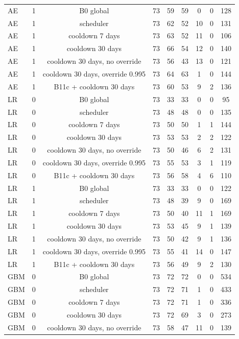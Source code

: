 \documentclass[10pt,onecolumn,letterpaper]{article}
\begin{document}
\begin{table}[!t]
{\begin{tabular}{lcccccccc}
AE & 1 & B0 global & 73 & 59 & 59 & 0 & 0 & 128 \\
AE & 1 & scheduler & 73 & 62 & 52 & 10 & 0 & 131 \\
AE & 1 & cooldown 7 days & 73 & 63 & 52 & 11 & 0 & 106 \\
AE & 1 & cooldown 30 days & 73 & 66 & 54 & 12 & 0 & 140 \\
AE & 1 & cooldown 30 days, no override & 73 & 56 & 43 & 13 & 0 & 121 \\
AE & 1 & cooldown 30 days, override 0.995 & 73 & 64 & 63 & 1 & 0 & 144 \\
AE & 1 & B11c + cooldown 30 days & 73 & 60 & 53 & 9 & 2 & 136 \\
LR & 0 & B0 global & 73 & 33 & 33 & 0 & 0 & 95 \\
LR & 0 & scheduler & 73 & 48 & 48 & 0 & 0 & 135 \\
LR & 0 & cooldown 7 days & 73 & 50 & 50 & 1 & 1 & 144 \\
LR & 0 & cooldown 30 days & 73 & 53 & 53 & 2 & 2 & 122 \\
LR & 0 & cooldown 30 days, no override & 73 & 50 & 46 & 6 & 2 & 131 \\
LR & 0 & cooldown 30 days, override 0.995 & 73 & 55 & 53 & 3 & 1 & 119 \\
LR & 0 & B11c + cooldown 30 days & 73 & 56 & 58 & 4 & 6 & 110 \\
LR & 1 & B0 global & 73 & 33 & 33 & 0 & 0 & 122 \\
LR & 1 & scheduler & 73 & 48 & 39 & 9 & 0 & 169 \\
LR & 1 & cooldown 7 days & 73 & 50 & 40 & 11 & 1 & 169 \\
LR & 1 & cooldown 30 days & 73 & 53 & 45 & 9 & 1 & 139 \\
LR & 1 & cooldown 30 days, no override & 73 & 50 & 42 & 9 & 1 & 136 \\
LR & 1 & cooldown 30 days, override 0.995 & 73 & 55 & 41 & 14 & 0 & 147 \\
LR & 1 & B11c + cooldown 30 days & 73 & 56 & 49 & 9 & 2 & 130 \\
GBM & 0 & B0 global & 73 & 72 & 72 & 0 & 0 & 534 \\
GBM & 0 & scheduler & 73 & 72 & 71 & 1 & 0 & 433 \\
GBM & 0 & cooldown 7 days & 73 & 72 & 71 & 1 & 0 & 336 \\
GBM & 0 & cooldown 30 days & 73 & 72 & 69 & 3 & 0 & 273 \\
GBM & 0 & cooldown 30 days, no override & 73 & 58 & 47 & 11 & 0 & 139 \\

\end{tabular}}
\end{table}
\end{document}
